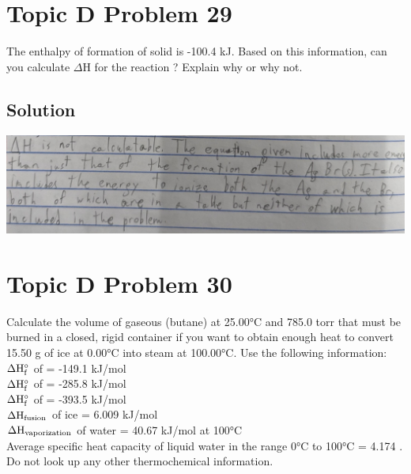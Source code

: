 \documentclass[10pt]{article}
\begin{document}
    \pagebreak
    \section{Topic D Problem 29}
        The enthalpy of formation of solid  is -100.4 kJ. 
        Based on this information, can you calculate $\Delta$H for the reaction ? 
        Explain why or why not.

        \subsection{Solution}
            \begin{center}
                \includegraphics[width=\textwidth]{Answers Images/D29.jpg}
            \end{center}



    \pagebreak
    \section{Topic D Problem 30}
        Calculate the volume of gaseous  (butane) at 25.00\unit{\celsius} 
        and 785.0 torr that must be burned in a closed, rigid container if you want to obtain enough heat to convert 15.50 g of ice at 0.00\unit{\celsius} into steam at 100.00\unit{\celsius}. 
        Use the following information:\\
        $\rm \Delta H_f^{\circ}$ of  = -149.1 kJ/mol\\
        $\rm \Delta H_f^{\circ}$ of  = -285.8 kJ/mol\\
        $\rm \Delta H_f^{\circ}$ of  = -393.5 kJ/mol\\
        $\rm \Delta H_{fusion}$ of ice = 6.009 kJ/mol\\
        $\rm \Delta H_{vaporization}$ of water = 40.67 kJ/mol at 100\unit{\celsius}\\
        Average specific heat capacity of liquid water in the range 0\unit{\celsius} to 100\unit{\celsius} = 4.174 \unit{\frac{\joule}{\gram\cdot\celsius}}.
        Do not look up any other thermochemical information. 
\end{document}
